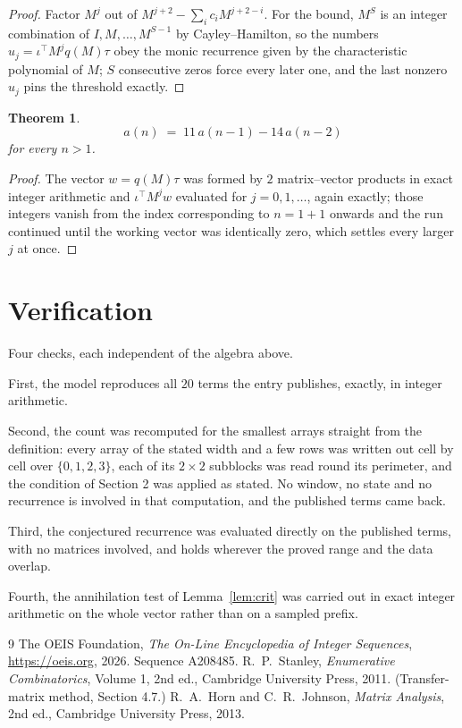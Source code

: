 \documentclass[11pt,a4paper]{article}
\theoremstyle{plain}
\newtheorem{theorem}{Theorem}
\theoremstyle{definition}
\begin{document}
\begin{proof}
Factor $M^{j}$ out of $M^{j+2}-\sum_ic_iM^{j+2-i}$. For the bound, $M^{S}$
is an integer combination of $I,M,\dots,M^{S-1}$ by Cayley--Hamilton, so the numbers
$u_j=\iota^{\!\top}M^{j}q(M)\tau$ obey the monic recurrence given by the characteristic
polynomial of $M$; $S$ consecutive zeros force every later one, and the last nonzero $u_j$
pins the threshold exactly.
\end{proof}

\begin{theorem}
\[
a(n)\;=\;11\,a(n-1) - 14\,a(n-2)
\]
for every $n>1$.
\end{theorem}

\begin{proof}
The vector $w=q(M)\tau$ was formed by $2$ matrix--vector products in exact integer
arithmetic and $\iota^{\!\top}M^{j}w$ evaluated for $j=0,1,\dots$, again exactly; those
integers vanish from the index corresponding to $n=1+1$ onwards and the run continued
until the working vector was identically zero, which settles every larger $j$ at once.
\end{proof}

\section{Verification}

Four checks, each independent of the algebra above.

First, the model reproduces all $20$ terms the entry publishes, exactly, in integer
arithmetic.

Second, the count was recomputed for the smallest arrays straight from the definition: every
array of the stated width and a few rows was written out cell by cell over $\{0,1,2,3\}$, each of
its $2\times2$ subblocks was read round its perimeter, and the condition of Section 2 was
applied as stated. No window, no state and no recurrence is involved in that computation, and
the published terms came back.

Third, the conjectured recurrence was evaluated directly on the published terms, with no
matrices involved, and holds wherever the proved range and the data overlap.

Fourth, the annihilation test of Lemma~\ref{lem:crit} was carried out in exact integer
arithmetic on the whole vector rather than on a sampled prefix.

\begin{thebibliography}{9}
 The OEIS Foundation, \emph{The On-Line Encyclopedia of Integer
Sequences}, \url{https://oeis.org}, 2026. Sequence A208485.
 R.~P.~Stanley, \emph{Enumerative Combinatorics}, Volume 1, 2nd ed.,
Cambridge University Press, 2011. (Transfer-matrix method, Section 4.7.)
 R.~A.~Horn and C.~R.~Johnson, \emph{Matrix Analysis}, 2nd ed., Cambridge
University Press, 2013.
\end{thebibliography}
\end{document}
